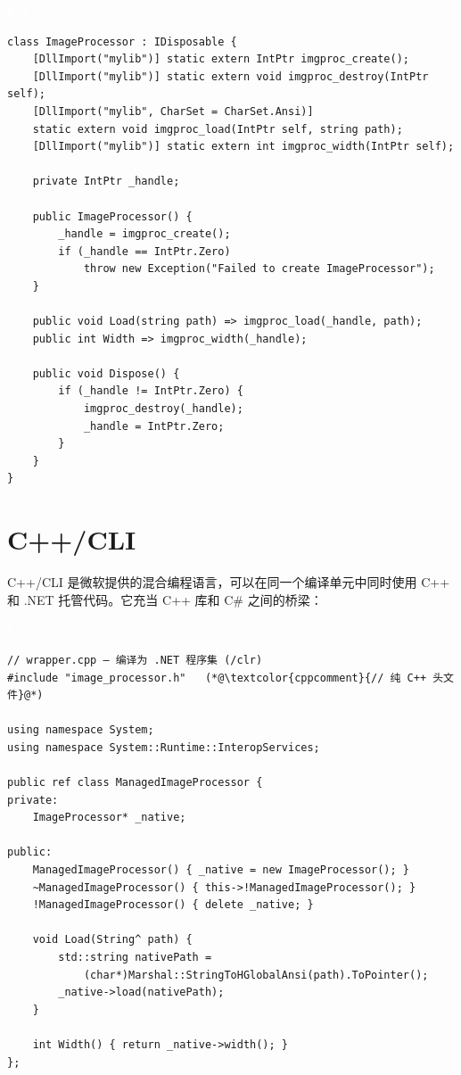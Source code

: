 \documentclass[12pt,a4paper,fontset=fandol]{ctexbook}
\newcommand{\cpplabel}{%
  \begin{tcolorbox}[enhanced,colback=cppheadbg,colframe=cppheadbg,
    arc=1mm,boxrule=0mm,left=6pt,right=6pt,top=2pt,bottom=2pt,
    halign=left,oversize]
    \textcolor{white}{\small\bfseries C++}
  \end{tcolorbox}\vspace{-4pt}}
\newcommand{\csharplabel}{%
  \begin{tcolorbox}[enhanced,colback=csharpheadbg,colframe=csharpheadbg,
    arc=1mm,boxrule=0mm,left=6pt,right=6pt,top=2pt,bottom=2pt,
    halign=left,oversize]
    \textcolor{white}{\small\bfseries C\#}
  \end{tcolorbox}\vspace{-4pt}}
\newcommand{\cpp}[1]{C++#1}
\begin{document}
\csharplabel
\begin{lstlisting}[style=csharpstyle]
class ImageProcessor : IDisposable {
    [DllImport("mylib")] static extern IntPtr imgproc_create();
    [DllImport("mylib")] static extern void imgproc_destroy(IntPtr self);
    [DllImport("mylib", CharSet = CharSet.Ansi)]
    static extern void imgproc_load(IntPtr self, string path);
    [DllImport("mylib")] static extern int imgproc_width(IntPtr self);

    private IntPtr _handle;

    public ImageProcessor() {
        _handle = imgproc_create();
        if (_handle == IntPtr.Zero)
            throw new Exception("Failed to create ImageProcessor");
    }

    public void Load(string path) => imgproc_load(_handle, path);
    public int Width => imgproc_width(_handle);

    public void Dispose() {
        if (_handle != IntPtr.Zero) {
            imgproc_destroy(_handle);
            _handle = IntPtr.Zero;
        }
    }
}
\end{lstlisting}

\section{C++/CLI}

C++/CLI 是微软提供的混合编程语言，可以在同一个编译单元中同时使用 \cpp{} 和 .NET 托管代码。它充当 \cpp{} 库和 C\# 之间的桥梁：

\cpplabel
\begin{lstlisting}[style=cppstyle]
// wrapper.cpp — 编译为 .NET 程序集 (/clr)
#include "image_processor.h"   (*@\textcolor{cppcomment}{// 纯 C++ 头文件}@*)

using namespace System;
using namespace System::Runtime::InteropServices;

public ref class ManagedImageProcessor {
private:
    ImageProcessor* _native;

public:
    ManagedImageProcessor() { _native = new ImageProcessor(); }
    ~ManagedImageProcessor() { this->!ManagedImageProcessor(); }
    !ManagedImageProcessor() { delete _native; }

    void Load(String^ path) {
        std::string nativePath =
            (char*)Marshal::StringToHGlobalAnsi(path).ToPointer();
        _native->load(nativePath);
    }

    int Width() { return _native->width(); }
};
\end{lstlisting}
\end{document}
